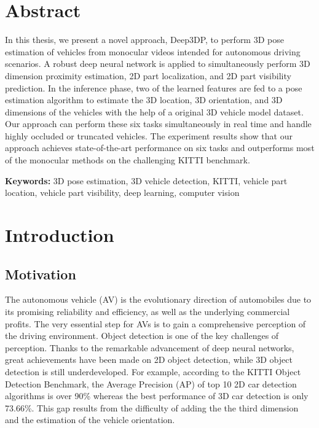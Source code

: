 \documentclass[a4paper,12pt]{article}
\begin{document}
\Coverpage

%

\section*{Abstract}
In this thesis, we present a novel approach, Deep3DP, to perform 3D pose estimation of vehicles from monocular videos intended for autonomous driving scenarios. A robust deep neural network is applied to simultaneously perform 3D dimension proximity estimation, 2D part localization, and 2D part visibility prediction. In the inference phase, two of the learned features are fed to a pose estimation algorithm to estimate the 3D location, 3D orientation, and 3D dimensions of the vehicles with the help of a original 3D vehicle model dataset. Our approach can perform these six tasks simultaneously in real time and handle highly occluded or truncated vehicles. The experiment results show that our approach achieves state-of-the-art performance on six tasks and outperforms most of the monocular methods on the challenging KITTI benchmark.

\textbf{Keywords:} 3D pose estimation, 3D vehicle detection, KITTI, vehicle part location, vehicle part visibility, deep learning, computer vision
\clearpage

\tableofcontents
\clearpage
\listoffigures
\clearpage
\listoftables
\clearpage

%


\section{Introduction}
\subsection{Motivation}
The autonomous vehicle (AV) is the evolutionary direction of automobiles due to its promising reliability and efficiency, as well as the underlying commercial profits.  The very essential step for AVs is to gain a comprehensive perception of the driving environment. Object detection is one of the key challenges of perception. Thanks to the remarkable advancement of deep neural networks, great achievements have been made on 2D object detection, while 3D object detection is still underdeveloped. For example, according to the  KITTI Object Detection Benchmark\cite{Geiger2012CVPR}, the Average Precision (AP) of  top 10 2D car detection algorithms is over 90\% whereas the best performance of 3D car detection is only 73.66\%. This gap results from the difficulty of adding the the third dimension and the estimation of the vehicle orientation.
\end{document}

